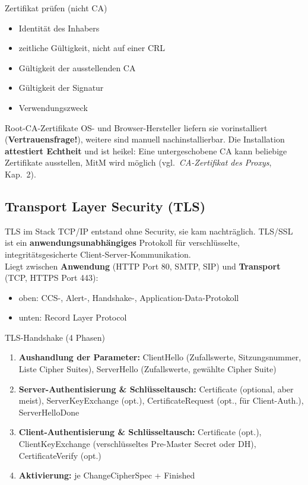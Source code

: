 \documentclass[a4paper, fontsize=7pt]{scrartcl}
\begin{document}
\begin{mainbox}{Zertifikat prüfen (nicht CA)}
\begin{itemize}
    \item Identität des Inhabers
    \item zeitliche Gültigkeit, nicht auf einer CRL
    \item Gültigkeit der ausstellenden CA
    \item Gültigkeit der Signatur
    \item Verwendungszweck
\end{itemize}
\end{mainbox}

\begin{subbox}{Root-CA-Zertifikate}
OS- und Browser-Hersteller liefern sie vorinstalliert (\textbf{Vertrauensfrage!}),
weitere sind manuell nachinstallierbar. Die Installation \textbf{attestiert
Echtheit} und ist heikel: Eine untergeschobene CA kann beliebige Zertifikate
ausstellen, MitM wird möglich (vgl.\ \emph{CA-Zertifikat des Proxys}, Kap.\ 2).
\end{subbox}

\subsection{Transport Layer Security (TLS)}

\begin{mainbox}{TLS im Stack}
TCP/IP entstand ohne Security, sie kam nachträglich. TLS/SSL ist ein
\textbf{anwendungsunabhängiges} Protokoll für verschlüsselte, integritätsgesicherte
Client-Server-Kommunikation.\\
Liegt zwischen \textbf{Anwendung} (HTTP Port 80, SMTP, SIP) und \textbf{Transport}
(TCP, HTTPS Port 443):
\begin{itemize}
    \item oben: CCS-, Alert-, Handshake-, Application-Data-Protokoll
    \item unten: Record Layer Protocol
\end{itemize}
\end{mainbox}

\begin{mainbox}{TLS-Handshake (4 Phasen)}
\begin{enumerate}
    \item \textbf{Aushandlung der Parameter:} ClientHello (Zufallswerte,
          Sitzungsnummer, Liste Cipher Suites), ServerHello (Zufallswerte, gewählte
          Cipher Suite)
    \item \textbf{Server-Authentisierung \& Schlüsseltausch:} Certificate
          (optional, aber meist), ServerKeyExchange (opt.), CertificateRequest
          (opt., für Client-Auth.), ServerHelloDone
    \item \textbf{Client-Authentisierung \& Schlüsseltausch:} Certificate (opt.),
          ClientKeyExchange (verschlüsseltes Pre-Master Secret oder DH),
          CertificateVerify (opt.)
    \item \textbf{Aktivierung:} je ChangeCipherSpec + Finished
\end{enumerate}
\end{mainbox}
\end{document}
